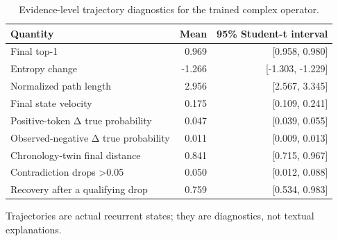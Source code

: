 \begin{table}[t]
\centering
\caption{Evidence-level trajectory diagnostics for the trained complex operator.}
\label{tab:trajectory_metrics}
\begin{tabular}{lrr}
\toprule
Quantity & Mean & 95\% Student-t interval \\
\midrule
Final top-1 & 0.969 & [0.958, 0.980] \\
Entropy change & -1.266 & [-1.303, -1.229] \\
Normalized path length & 2.956 & [2.567, 3.345] \\
Final state velocity & 0.175 & [0.109, 0.241] \\
Positive-token Δ true probability & 0.047 & [0.039, 0.055] \\
Observed-negative Δ true probability & 0.011 & [0.009, 0.013] \\
Chronology-twin final distance & 0.841 & [0.715, 0.967] \\
Contradiction drops >0.05 & 0.050 & [0.012, 0.088] \\
Recovery after a qualifying drop & 0.759 & [0.534, 0.983] \\
\bottomrule
\end{tabular}
\begin{minipage}{0.96\linewidth}\footnotesize Trajectories are actual recurrent states; they are diagnostics, not textual explanations.\end{minipage}
\end{table}
